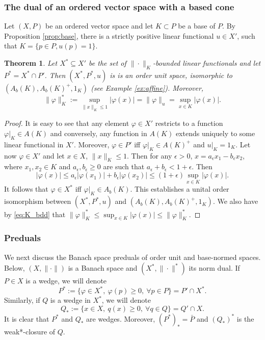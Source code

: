 \documentclass[12pt]{article}
\newtheorem{thm}{Theorem}
\theoremstyle{remark}
\newcommand{\<}{\langle}
\begin{document}
\subsubsection*{The dual of an ordered vector space with a based cone}


Let $(X,P)$ be an ordered vector space and let $K\subset P$ be a base of $P$. By Proposition \ref{prop:base}, there is a strictly positive linear functional $u\in X'$, such that $K=\{p\in P, u(p)=1\}$. 



\begin{thm} \label{thm:base_dual} Let $X^*\subseteq X'$ be the set of $\|\cdot\|_K$-bounded linear functionals and let $P^*=X^*\cap P'$. Then
 $(X^*,P^*,u)$ is is an order unit space,  isomorphic to $(A_b(K),A_b(K)^+,1_K)$ (see Example \ref{ex:affine}). Moreover,  
\[
\|\varphi\|_K^*:=\sup_{\|x\|_K\le 1} |\varphi(x)|=\|\varphi\|_u=\sup_{x\in K}|\varphi(x)|. 
\]
\end{thm}

\begin{proof} It is easy to see that any element $\varphi\in X'$ restricts to a function $\varphi|_K\in A(K)$ and conversely, any 
function in $A(K)$ extends uniquely to some linear functional in $X'$. Moreover, $\varphi\in P'$ iff $\varphi|_K\in A(K)^+$ and 
$u|_K=1_K$. Let now $\varphi\in X'$ and let $x\in X$, $\|x\|_K\le 1$. Then for any $\epsilon>0$, $x=a_\epsilon x_1-b_\epsilon x_2$, where $x_1,x_2\in K$ and $a_\epsilon,b_\epsilon\ge 0$ are such that $a_\epsilon+b_\epsilon <1+\epsilon$. Then 
\begin{equation}\label{eq:K_bdd}
|\varphi(x)|\le a_\epsilon |\varphi(x_1)|+b_\epsilon |\varphi(x_2)|\le (1+\epsilon)\sup_{x\in K} |\varphi(x)|.
\end{equation}
It follows that $\varphi\in X^*$ iff $\varphi|_K\in A_b(K)$. This establishes a unital order  isomorphism between $(X^*,P^*,u)$ and 
$(A_b(K),A_b(K)^+,1_K)$.
We also have by \eqref{eq:K_bdd} that  $\|\varphi\|_K^*\le \sup_{x\in K}|\varphi(x)|\le \|\varphi\|_K^*$. 

\end{proof}




\subsubsection*{Preduals}

We next discuss the Banach space preduals of order unit and base-normed spaces. Below,  $(X,\|\cdot\|)$ is a Banach space and
$(X^*,\|\cdot\|^*)$ its norm dual.  If $P\in X$ is a wedge, we will denote 
\[
P^*:=\{\varphi\in X^*,\ \varphi(p)\ge 0,\ \forall p\in P\}= P'\cap X^*.
\]
Similarly, if $Q$ is a wedge in $X^*$, we will denote 
\[
Q_*:=\{x\in X,\ q(x)\ge 0,\ \forall q\in Q\}= Q'\cap X.
\]
It is clear that $P^*$ and $Q_*$ are wedges. Moreover, $(P^*)_*=\bar P$ and $(Q_*)^*$ is the weak*-closure of $Q$. 
\end{document}
